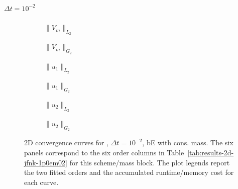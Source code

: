 \subsubsection{}
\paragraph{$\Delta t=10^{-2}$}

\begin{figure}[p]
\centering
\begin{subfigure}{0.485\linewidth}
\centering
{}
\caption{$\|V_m\|_{L_2}$}
\label{fig:results-2d-jfnk-1p0em02-backwardeuler-consistent-a}
\end{subfigure}
\hfill
\begin{subfigure}{0.485\linewidth}
\centering
{}
\caption{$\|V_m\|_{G_2}$}
\label{fig:results-2d-jfnk-1p0em02-backwardeuler-consistent-b}
\end{subfigure}
\par\vspace{0.8em}
\begin{subfigure}{0.485\linewidth}
\centering
{}
\caption{$\|u_1\|_{L_2}$}
\label{fig:results-2d-jfnk-1p0em02-backwardeuler-consistent-c}
\end{subfigure}
\hfill
\begin{subfigure}{0.485\linewidth}
\centering
{}
\caption{$\|u_1\|_{G_2}$}
\label{fig:results-2d-jfnk-1p0em02-backwardeuler-consistent-d}
\end{subfigure}
\par\vspace{0.8em}
\begin{subfigure}{0.485\linewidth}
\centering
{}
\caption{$\|u_2\|_{L_2}$}
\label{fig:results-2d-jfnk-1p0em02-backwardeuler-consistent-e}
\end{subfigure}
\hfill
\begin{subfigure}{0.485\linewidth}
\centering
{}
\caption{$\|u_2\|_{G_2}$}
\label{fig:results-2d-jfnk-1p0em02-backwardeuler-consistent-f}
\end{subfigure}
\caption{2D convergence curves for , $\Delta t=10^{-2}$, bE with cons. mass. The six panels correspond to the six order columns in Table~\ref{tab:results-2d-jfnk-1p0em02} for this scheme/mass block. The plot legends report the two fitted orders and the accumulated runtime/memory cost for each curve.}
\label{fig:results-2d-jfnk-1p0em02-backwardeuler-consistent}
\end{figure}
\FloatBarrier

